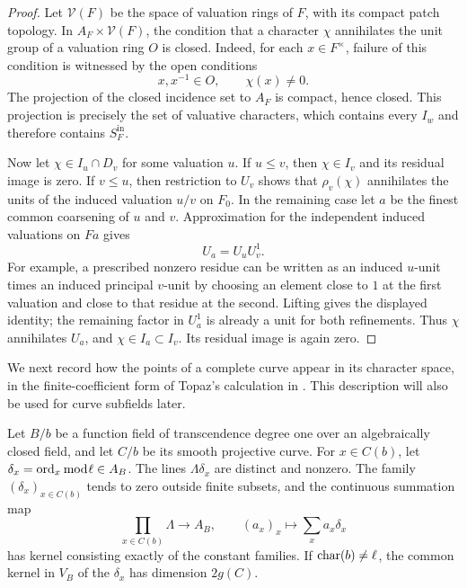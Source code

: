 \begin{proof}
Let \(\mathcal V(F)\) be the space of valuation rings of \(F\), with its
compact patch topology. In
\(A_F\times\mathcal V(F)\), the condition that a character \(\chi\)
annihilates the unit group of a valuation ring \(O\) is closed.
Indeed, for each \(x\in F^\times\), failure of this condition is
witnessed by the open conditions
\[
 x,x^{-1}\in O,\qquad \chi(x)\ne0.
\]
The projection of the closed incidence set to \(A_F\) is compact,
hence closed. This projection is precisely the set of valuative
characters, which contains every \(I_w\) and therefore contains
\(S_F^{\mathrm{in}}\).

Now let \(\chi\in I_u\cap D_v\) for some valuation \(u\).
If \(u\leq v\), then \(\chi\in I_v\) and its residual image is zero.
If \(v\leq u\), then restriction to \(U_v\) shows that
\(\rho_v(\chi)\) annihilates the units of the induced valuation \(u/v\)
on \(F_0\).
In the remaining case let \(a\) be the finest common coarsening of
\(u\) and \(v\). Approximation for the independent induced valuations
on \(Fa\) gives
\[
 U_a=U_u U_v^1.
\]
For example, a prescribed nonzero residue can be written as an
induced \(u\)-unit times an induced principal \(v\)-unit by choosing
an element close to \(1\) at the first valuation and close to that
residue at the second. Lifting gives the displayed identity; the
remaining factor in \(U_a^1\) is already a unit for both refinements.
Thus \(\chi\) annihilates \(U_a\), and
\(\chi\in I_a\subset I_v\). Its residual image is again zero.
\end{proof}

We next record how the points of a complete curve appear in its
character space, in the finite-coefficient form of Topaz's
calculation in \cite[appendix, Lemma~5, pp.~354--355]{Pop2015}.
This description will also be used for curve subfields later.

\begin{lemma}\label{lem:curve-orders}
Let \(B/b\) be a function field of transcendence degree one over an
algebraically closed field, and let \(C/b\) be its smooth projective
curve. For \(x\in C(b)\), let
\(\delta_x=\operatorname{ord}_x\bmod\ell\in A_B\).
The lines \(\Lambda\delta_x\) are distinct and nonzero.
The family \((\delta_x)_{x\in C(b)}\) tends to zero outside finite
subsets, and the continuous summation map
\begin{equation}\label{eq:curve-summation}
 \prod_{x\in C(b)}\Lambda\longrightarrow A_B,\qquad
 (a_x)_x\longmapsto\sum_x a_x\delta_x
\end{equation}
has kernel consisting exactly of the constant families.
If \(\operatorname{char}(b)\ne\ell\), the common kernel in \(V_B\) of the
\(\delta_x\) has dimension \(2g(C)\).
\end{lemma}

